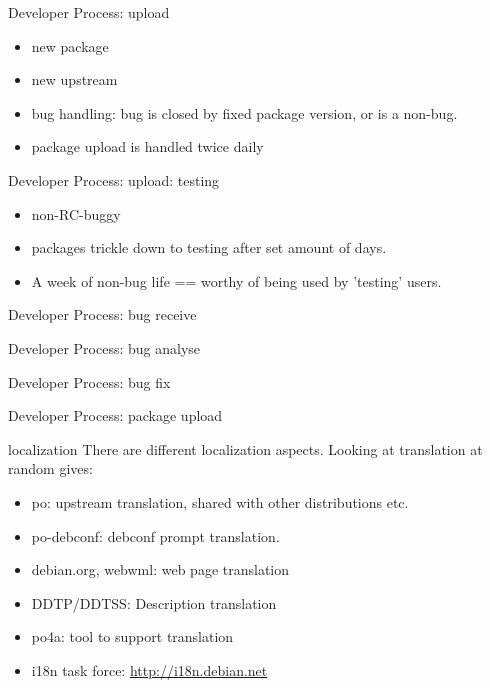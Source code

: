 \documentclass[cjk,dvipdfm,12pt]{beamer}
\begin{document}
\begin{frame}{Developer Process: upload}

 \begin{itemize}
  \item new package 
  \item new upstream
  \item bug handling:
	bug is closed by fixed package version, or is a non-bug.
  \item package upload is handled twice daily
 \end{itemize}
\end{frame}

\begin{frame}{Developer Process: upload: testing}
 \begin{itemize}
  \item non-RC-buggy
  \item packages trickle down to testing after set amount of days.
  \item A week of non-bug life == worthy of being used by 'testing' users.
 \end{itemize}
\end{frame}

\begin{frame}{Developer Process: bug receive}
\end{frame}

\begin{frame}{Developer Process: bug analyse}
\end{frame}

\begin{frame}{Developer Process: bug fix}
\end{frame}

\begin{frame}{Developer Process: package upload}
\end{frame}

\begin{frame}{localization}
 There are different localization aspects. Looking at translation at
 random gives:
\begin{itemize}
 \item po: upstream translation, shared with other distributions etc.
 \item po-debconf: debconf prompt translation.
 \item debian.org, webwml: web page translation
 \item DDTP/DDTSS: Description translation
 \item po4a: tool to support translation
 \item i18n task force: \url{http://i18n.debian.net}
\end{itemize}
\end{frame}
\end{document}
